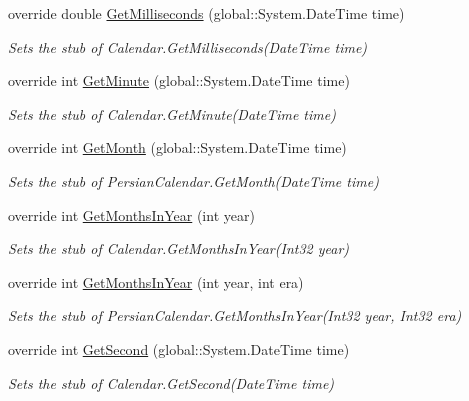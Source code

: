 \begin{DoxyCompactItemize}
override double \hyperlink{class_system_1_1_globalization_1_1_fakes_1_1_stub_persian_calendar_a79c08a9ce8bf483cd03126e9ace861db}{Get\-Milliseconds} (global\-::\-System.\-Date\-Time time)
\begin{DoxyCompactList}\small\item\em Sets the stub of Calendar.\-Get\-Milliseconds(\-Date\-Time time)\end{DoxyCompactList}\item 
override int \hyperlink{class_system_1_1_globalization_1_1_fakes_1_1_stub_persian_calendar_a35aea2c1a90c42179c8b8dddd27d4788}{Get\-Minute} (global\-::\-System.\-Date\-Time time)
\begin{DoxyCompactList}\small\item\em Sets the stub of Calendar.\-Get\-Minute(\-Date\-Time time)\end{DoxyCompactList}\item 
override int \hyperlink{class_system_1_1_globalization_1_1_fakes_1_1_stub_persian_calendar_aeefb3cf48d33f4c0a0d79c4863bc93ea}{Get\-Month} (global\-::\-System.\-Date\-Time time)
\begin{DoxyCompactList}\small\item\em Sets the stub of Persian\-Calendar.\-Get\-Month(\-Date\-Time time)\end{DoxyCompactList}\item 
override int \hyperlink{class_system_1_1_globalization_1_1_fakes_1_1_stub_persian_calendar_a9839522aec72b0ea8db297668fd2efb3}{Get\-Months\-In\-Year} (int year)
\begin{DoxyCompactList}\small\item\em Sets the stub of Calendar.\-Get\-Months\-In\-Year(\-Int32 year)\end{DoxyCompactList}\item 
override int \hyperlink{class_system_1_1_globalization_1_1_fakes_1_1_stub_persian_calendar_a2ebacf1cde54613404f09f1e6a12e850}{Get\-Months\-In\-Year} (int year, int era)
\begin{DoxyCompactList}\small\item\em Sets the stub of Persian\-Calendar.\-Get\-Months\-In\-Year(\-Int32 year, Int32 era)\end{DoxyCompactList}\item 
override int \hyperlink{class_system_1_1_globalization_1_1_fakes_1_1_stub_persian_calendar_a790aaaaee0042013fa523a196f59be1d}{Get\-Second} (global\-::\-System.\-Date\-Time time)
\begin{DoxyCompactList}\small\item\em Sets the stub of Calendar.\-Get\-Second(\-Date\-Time time)\end{DoxyCompactList}\item 

\end{DoxyCompactItemize}
